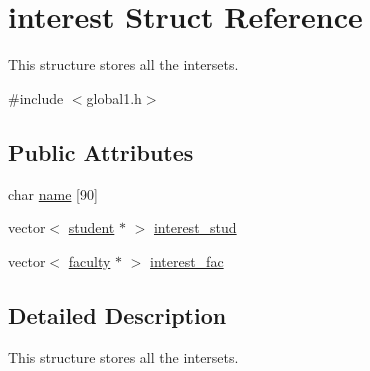 \hypertarget{structinterest}{\section{interest \-Struct \-Reference}
\label{structinterest}
}


\-This structure stores all the intersets.  




{\ttfamily \#include $<$global1.\-h$>$}

\subsection*{\-Public \-Attributes}
\begin{DoxyCompactItemize}
\item 
char \hyperlink{structinterest_a92ad14a1e0add2231b55593c5939383f}{name} \mbox{[}90\mbox{]}
\item 
vector$<$ \hyperlink{structstudent}{student} $\ast$ $>$ \hyperlink{structinterest_a8e0fd6edf9d01b082b324c51e6856b79}{interest\-\_\-stud}
\item 
vector$<$ \hyperlink{structfaculty}{faculty} $\ast$ $>$ \hyperlink{structinterest_a19e8aa2cc4abff18e329f6a2fbcaa07c}{interest\-\_\-fac}
\end{DoxyCompactItemize}


\subsection{\-Detailed \-Description}
\-This structure stores all the intersets. 

